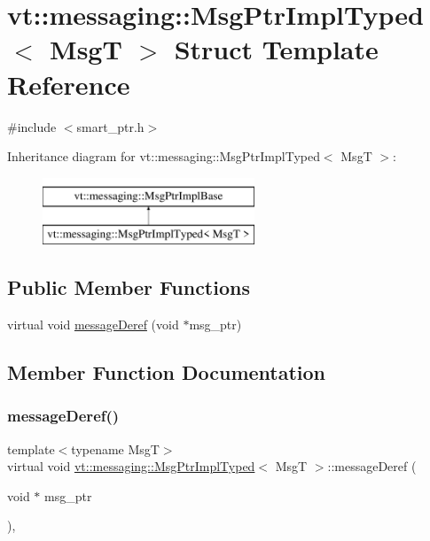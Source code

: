 \hypertarget{structvt_1_1messaging_1_1_msg_ptr_impl_typed}{}\section{vt\+:\+:messaging\+:\+:Msg\+Ptr\+Impl\+Typed$<$ MsgT $>$ Struct Template Reference}
\label{structvt_1_1messaging_1_1_msg_ptr_impl_typed}


{\ttfamily \#include $<$smart\+\_\+ptr.\+h$>$}

Inheritance diagram for vt\+:\+:messaging\+:\+:Msg\+Ptr\+Impl\+Typed$<$ MsgT $>$\+:\begin{figure}[H]
\begin{center}
\leavevmode
\includegraphics[height=2.000000cm]{structvt_1_1messaging_1_1_msg_ptr_impl_typed}
\end{center}
\end{figure}
\subsection*{Public Member Functions}
\begin{DoxyCompactItemize}
\item 
virtual void \hyperlink{structvt_1_1messaging_1_1_msg_ptr_impl_typed_aa56386ba3acc0fa3a827e337872a87d2}{message\+Deref} (void $\ast$msg\+\_\+ptr)
\end{DoxyCompactItemize}


\subsection{Member Function Documentation}
\mbox{\label{structvt_1_1messaging_1_1_msg_ptr_impl_typed_aa56386ba3acc0fa3a827e337872a87d2}} 
\subsubsection{\texorpdfstring{message\+Deref()}{messageDeref()}}
{\footnotesize\ttfamily template$<$typename MsgT$>$ \\
virtual void \hyperlink{structvt_1_1messaging_1_1_msg_ptr_impl_typed}{vt\+::messaging\+::\+Msg\+Ptr\+Impl\+Typed}$<$ MsgT $>$\+::message\+Deref (\begin{DoxyParamCaption}\item[{void $\ast$}]{msg\+\_\+ptr }\end{DoxyParamCaption})\hspace{0.3cm}{\ttfamily [inline]}, {\ttfamily [virtual]}}

